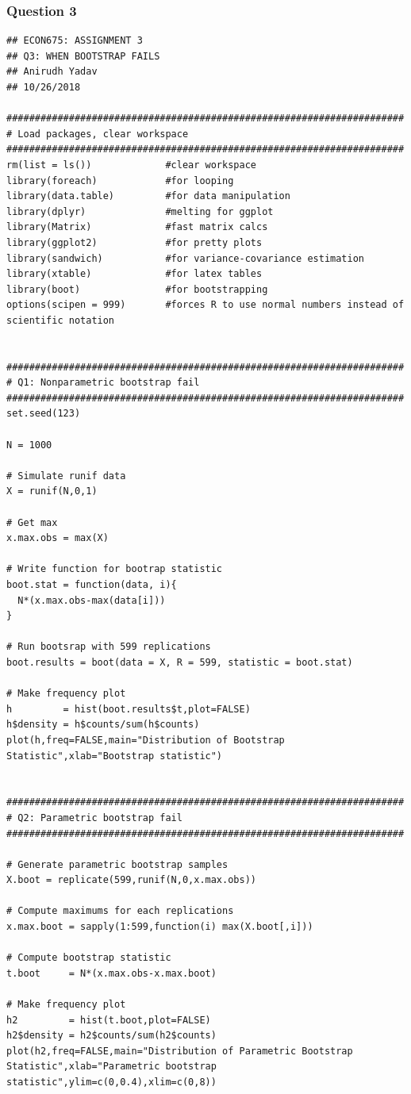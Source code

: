 \documentclass[12pt]{article}
\begin{document}
\subsubsection{Question 3}
\begin{verbatim}
## ECON675: ASSIGNMENT 3
## Q3: WHEN BOOTSTRAP FAILS
## Anirudh Yadav 
## 10/26/2018

######################################################################
# Load packages, clear workspace
######################################################################
rm(list = ls())             #clear workspace
library(foreach)            #for looping
library(data.table)         #for data manipulation
library(dplyr)              #melting for ggplot
library(Matrix)             #fast matrix calcs
library(ggplot2)            #for pretty plots
library(sandwich)           #for variance-covariance estimation 
library(xtable)             #for latex tables
library(boot)               #for bootstrapping
options(scipen = 999)       #forces R to use normal numbers instead of scientific notation


######################################################################
# Q1: Nonparametric bootstrap fail
######################################################################
set.seed(123)

N = 1000

# Simulate runif data
X = runif(N,0,1)

# Get max
x.max.obs = max(X)

# Write function for bootrap statistic
boot.stat = function(data, i){
  N*(x.max.obs-max(data[i]))
}

# Run bootsrap with 599 replications
boot.results = boot(data = X, R = 599, statistic = boot.stat)

# Make frequency plot
h         = hist(boot.results$t,plot=FALSE)
h$density = h$counts/sum(h$counts)
plot(h,freq=FALSE,main="Distribution of Bootstrap Statistic",xlab="Bootstrap statistic")


######################################################################
# Q2: Parametric bootstrap fail
######################################################################

# Generate parametric bootstrap samples
X.boot = replicate(599,runif(N,0,x.max.obs))

# Compute maximums for each replications
x.max.boot = sapply(1:599,function(i) max(X.boot[,i]))

# Compute bootstrap statistic
t.boot     = N*(x.max.obs-x.max.boot)

# Make frequency plot
h2         = hist(t.boot,plot=FALSE)
h2$density = h2$counts/sum(h2$counts)
plot(h2,freq=FALSE,main="Distribution of Parametric Bootstrap Statistic",xlab="Parametric bootstrap statistic",ylim=c(0,0.4),xlim=c(0,8))

\end{verbatim}
\end{document}
